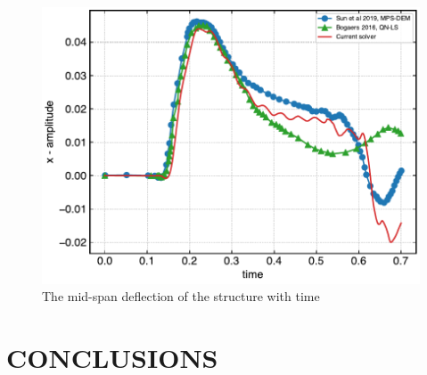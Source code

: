 \documentclass[10pt, conference]{FMFP2022}
\begin{document}
\begin{figure}[H]
  \includegraphics[scale=0.5]{figures/sun_2019_dam_breaking_flow_impacting_an_elastic_plate/x_amplitude}
  \caption{The mid-span deflection of the structure with time}
\label{fig:water-impact-plate-deflection-quantitative}
\end{figure}


\section{\textbf{CONCLUSIONS}}\label{sec4}
\end{document}
